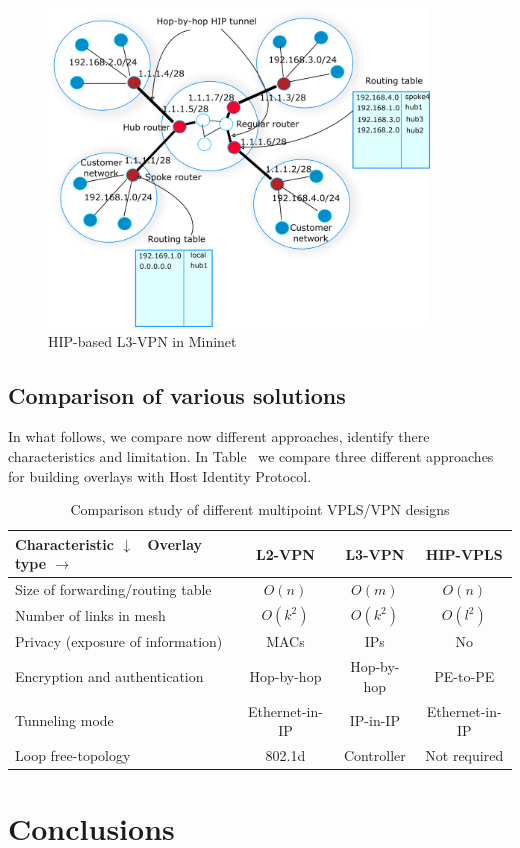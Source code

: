 \begin{figure}[h!]
    \centering
    \includegraphics[width=0.9\textwidth]{graphics/l3-vpn.png}
    \caption{HIP-based L3-VPN in Mininet}
    \label{fig:l3vpn}
\end{figure}

\section{Comparison of various solutions}

In what follows, we compare now different approaches, identify there
characteristics and limitation. In Table~\cite{tab:analysis} we 
compare three different approaches for building overlays with Host 
Identity Protocol. 

\begin{table}
    \small
    \begin{tabular}{|l|c|c|c|}
    \hline
    Characteristic $\downarrow$ \ Overlay type $\rightarrow$ & L2-VPN & L3-VPN & HIP-VPLS \\\hline
    Size of forwarding/routing table & $O(n)$ & $O(m)$ & $O(n)$\\\hline
    Number of links in mesh & $O(k^2)$ & $O(k^2)$ & $O(l^2)$ \\\hline
    Privacy (exposure of information) & MACs & IPs & No \\\hline
    Encryption and authentication & Hop-by-hop & Hop-by-hop & PE-to-PE \\\hline
    Tunneling mode & Ethernet-in-IP & IP-in-IP & Ethernet-in-IP \\\hline
    Loop free-topology & 802.1d & Controller & Not required \\\hline
    \end{tabular}
    \label{tab:analysis}
    \caption {Comparison study of different multipoint VPLS/VPN designs}
\end{table}

\chapter{Conclusions}






